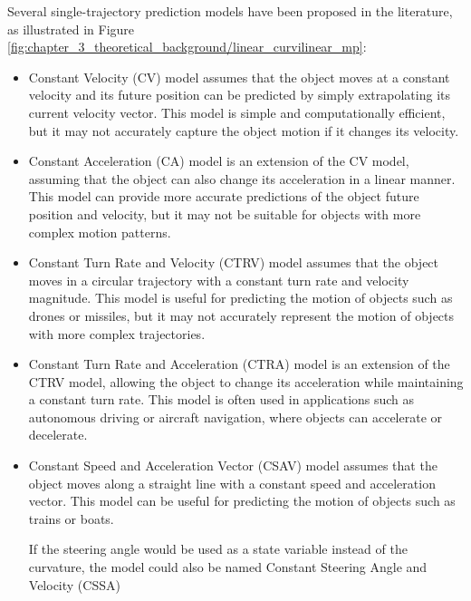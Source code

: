 
Several single-trajectory prediction models have been proposed in the literature, as illustrated in Figure \ref{fig:chapter_3_theoretical_background/linear_curvilinear_mp}:

\begin{itemize}
	
	\item Constant Velocity (CV) model assumes that the object moves at a constant velocity and its future position can be predicted by simply extrapolating its current velocity vector. This model is simple and computationally efficient, but it may not accurately capture the object motion if it changes its velocity.
	
	\item Constant Acceleration (CA) model is an extension of the CV model, assuming that the object can also change its acceleration in a linear manner. This model can provide more accurate predictions of the object future position and velocity, but it may not be suitable for objects with more complex motion patterns.
	
	\item Constant Turn Rate and Velocity (CTRV) model assumes that the object moves in a circular trajectory with a constant turn rate and velocity magnitude. This model is useful for predicting the motion of objects such as drones or missiles, but it may not accurately represent the motion of objects with more complex trajectories.
	
	\item Constant Turn Rate and Acceleration (CTRA) model is an extension of the CTRV model, allowing the object to change its acceleration while maintaining a constant turn rate. This model is often used in applications such as autonomous driving or aircraft navigation, where objects can accelerate or decelerate.
	
	\item Constant Speed and Acceleration Vector (CSAV) model assumes that the object moves along a straight line with a constant speed and acceleration vector. This model can be useful for predicting the motion of objects such as trains or boats.
	
	If the steering angle would be used as a state variable instead of the
	curvature, the model could also be named Constant Steering Angle and
	Velocity (CSSA)
	

\end{itemize}
